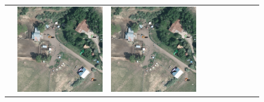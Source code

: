\begin{figure}[h!]
\begin{tabularx}{\textwidth}{c|*{9}{X}}
    & \includegraphics[trim={730pt 220pt 200pt 720pt},clip,width=\linewidth]{images/015Results/01abb_vs_obb/comp_images/obb/523.png}
    & \includegraphics[trim={850pt 110pt 80pt 830pt},clip,width=\linewidth]{images/015Results/01abb_vs_obb/comp_images/obb/523.png}

\end{tabularx}
\end{figure}
